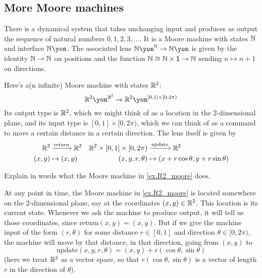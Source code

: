 \documentclass[Book-Poly]{subfiles}
\begin{document}
\subsection{More Moore machines}

\begin{example}\label{ex.counting_trajectory}
There is a dynamical system that takes unchanging input and produces as output the sequence of natural numbers $0,1,2,3,\ldots.$ It is a Moore machine with states $\mathbb{N}$ and interface $\nn\yon$. The associated lens $\nn\yon^\nn\to\nn\yon$ is given by the identity $\mathbb{N} \to \mathbb{N}$ on positions and the function $\mathbb{N} \cong \mathbb{N} \times \textsf{1} \to \mathbb{N}$ sending $n\mapsto n+1$ on directions.
\end{example}

\begin{example}\label{ex.R2_moore}
Here's a(n infinite) Moore machine with states $\mathbb{R}^{\textsf{2}}$:
\[
\rr^\2\yon^{\rr^\2}\to\rr^\2\yon^{[0,1]\times[0,2\pi)}%
\]
Its output type is $\mathbb{R}^{\textsf{2}}$, which we might think of as a location in the 2-dimensional plane, and its input type is $[0,1]\times[0,2\pi)$, which we can think of as a command to move a certain distance in a certain direction. The lens itself is given by
\begin{align*}
  \mathbb{R}^{\textsf{2}}&\xrightarrow{\text{return}}\mathbb{R}^{\textsf{2}}&
  \mathbb{R}^{\textsf{2}}\times[0,1]\times[0,2\pi)&\xrightarrow{\text{update}}\mathbb{R}^{\textsf{2}}
  	\\
  (x,y)&\mapsto(x,y)&
  (x,y,r,\theta)&\mapsto(x+r\cos\theta, y+r\sin\theta)
\end{align*}
\end{example}

\begin{exercise}
Explain in words what the Moore machine in \cref{ex.R2_moore} does.
\begin{solution}
At any point in time, the Moore machine in \cref{ex.R2_moore} is located somewhere on the $2$-dimensional plane, say at the coordinates $(x, y) \in \mathbb{R}^{\textsf{2}}$.
This location is its current state.
Whenever we ask the machine to produce output, it will tell us those coordinates, since $\text{return}(x, y) = (x, y)$.
But if we give the machine input of the form $(r, \theta)$ for some distance $r \in [0,1]$ and direction $\theta \in [0, 2\pi)$, the machine will move by that distance, in that direction, going from $(x, y)$ to
\[
    \text{update}(x,y,r,\theta) = (x,y) + r(\cos\theta, \sin\theta)
\]
(here we treat $\mathbb{R}^{\textsf{2}}$ as a vector space, so that $r(\cos\theta, \sin\theta)$ is a vector of length $r$ in the direction of $\theta$).
\end{solution}
\end{exercise}
\end{document}
